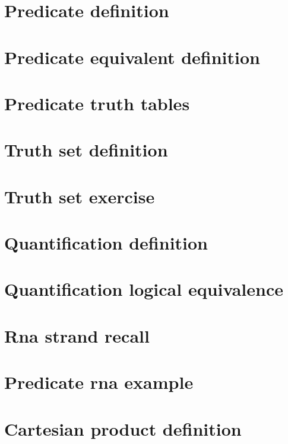 \section*{Predicate definition}

\vfill
\section*{Predicate equivalent definition}

\vfill
\section*{Predicate truth tables}

\vfill
\section*{Truth set definition}

\vfill
\section*{Truth set exercise}

\vfill
\section*{Quantification definition}

\vfill
\section*{Quantification logical equivalence}

\vfill
\section*{Rna strand recall}

\vfill
\section*{Predicate rna example}

\vfill
\section*{Cartesian product definition}

\vfill

